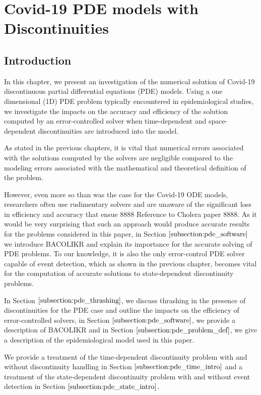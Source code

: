 \documentclass{article}
\begin{document}
\section{Covid-19 PDE models with Discontinuities}
\subsection{Introduction}
\label{subsection:pde_intro}
In this chapter, we present an investigation of the numerical solution of Covid-19 discontinuous partial differential equations (PDE) models. Using a one dimensional (1D) PDE problem typically encountered in epidemiological studies, we investigate the impacts on the accuracy and efficiency of the solution computed by an error-controlled solver when time-dependent and space-dependent discontinuities are introduced into the model.

As stated in the previous chapters, it is vital that numerical errors associated with the solutions computed by the solvers are negligible compared to the modeling errors associated with the mathematical and theoretical definition of the problem.

However, even more so than was the case for the Covid-19 ODE models, researchers often use rudimentary solvers and are unaware of the significant loss in efficiency and accuracy that ensue 8888 Reference to Cholera paper 8888. As it would be very surprising that such an approach would produce accurate results for the problems considered in this paper, in Section $\ref{subsection:pde_software}$ we introduce BACOLIKR and explain its importance for the accurate solving of PDE problems. To our knowledge, it is also the only error-control PDE solver capable of event detection, which as shown in the previous chapter, becomes vital for the computation of accurate solutions to state-dependent discontinuity problems.

In Section $\ref{subsection:pde_thrashing}$, we discuss thrashing in the presence of discontinuities for the PDE case and outline the impacts on the efficiency of error-controlled solvers, in Section $\ref{subsection:pde_software}$, we provide a description of BACOLIKR and in Section $\ref{subsection:pde_problem_def}$, we give a description of the epidemiological model used in this paper.

We provide a treatment of the time-dependent discontinuity problem with and without discontinuity handling in Section $\ref{subsection:pde_time_intro}$ and a treatment of the state-dependent discontinuity problem with and without event detection in Section $\ref{subsection:pde_state_intro}$.
\end{document}
